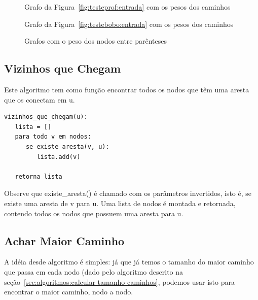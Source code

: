 \documentclass[12pt]{article}
\begin{document}
\begin{figure}
  \noindent %
  \begin{minipage}{0.45\linewidth}
    \begin{dot2tex}[neato,options=-tmath,scale=0.65]
        
    \end{dot2tex}
    \caption{Grafo da Figura~\ref{fig:testeprof:entrada} com os pesos dos caminhos}
    \label{fig:testeprof:grafo:pesos}
  \end{minipage}
  \begin{minipage}{0.45\linewidth}
    \begin{dot2tex}[neato,options=-tmath,scale=0.65]
        
    \end{dot2tex}
    \caption{Grafo da Figura~\ref{fig:testebobo:entrada} com os pesos dos caminhos}
    \label{fig:testebobo:grafo:pesos}
  \end{minipage}
  \caption{Grafos com o peso dos nodos entre parênteses}
  \label{fig:grafos:pesos}
\end{figure}


\subsection{Vizinhos que Chegam}\label{sec:algoritmos:vizinhos-que-chegam}
Este algoritmo tem como fun\c{c}ão encontrar todos os nodos que têm uma aresta que os conectam em {\sf u}.
\begin{lstlisting}
vizinhos_que_chegam(u):
   lista = []
   para todo v em nodos:
      se existe_aresta(v, u):
         lista.add(v)

   retorna lista
\end{lstlisting}

Observe que {\sf existe\_aresta()} é chamado com os parâmetros invertidos, isto é, se existe uma aresta de {\sf v} para {\sf u}.
Uma lista de nodos é montada e retornada, contendo todos os nodos que possuem uma aresta para {\sf u}.


\subsection{Achar Maior Caminho}\label{sec:algoritmos:achar-maior-caminho}
A idéia desde algoritmo é simples: já que já temos o tamanho do maior caminho que passa em cada nodo (dado pelo algoritmo descrito na se\c{c}ão~\ref{sec:algoritmos:calcular-tamanho-caminhos}, podemos usar isto para encontrar o maior caminho, nodo a nodo.
\end{document}
